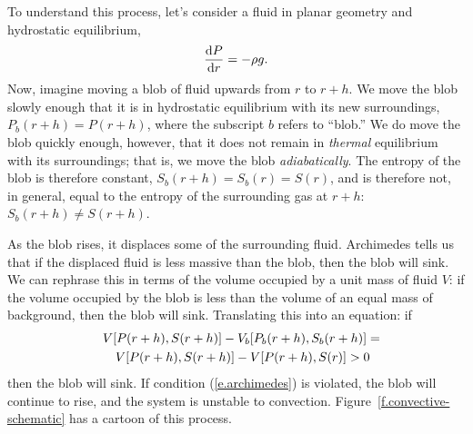 To understand this process, let's consider a fluid in planar geometry and hydrostatic equilibrium,
\begin{equation}
\frac{\mathrm{d} P}{\mathrm{d} r} = -\rho g.
\end{equation}
Now, imagine moving a blob of fluid upwards from $r$ to $r+h$.  We move the blob slowly enough that it is in hydrostatic equilibrium with its new surroundings, $P_{b}(r+h) = P(r+h)$, where the subscript $b$ refers to ``blob.'' We do move the blob quickly enough, however,  that it does not remain in \emph{thermal} equilibrium with its surroundings; that is, we move the blob \emph{adiabatically}.  The entropy of the blob is therefore constant, 
$S_{b}(r+h) = S_{b}(r) = S(r)$, and is therefore not, in general, equal to the entropy of the surrounding gas at $r+h$: $S_{b}(r+h)  \neq S(r+h)$.  

As the blob rises, it displaces some of the surrounding fluid. Archimedes tells us that if the displaced fluid is less massive than the blob, then the blob will sink.  We can rephrase this in terms of the volume occupied by a unit mass of fluid $V$: if the volume occupied by the blob is less than the volume of an equal mass of background, then the blob will sink. Translating this into an equation: if
\begin{eqnarray}
\lefteqn{V[P(r+h),S(r+h)] - V_{b}[P_{b}(r+h),S_{b}(r+h)] =}\nonumber\\
&&  V[P(r+h),S(r+h)] - V[P(r+h),S(r)] > 0
\label{e.archimedes}
\end{eqnarray}
then the blob will sink. If condition (\ref{e.archimedes}) is violated, the blob will continue to rise, and the system is unstable to convection.  
Figure~\ref{f.convective-schematic} has a cartoon of this process.

